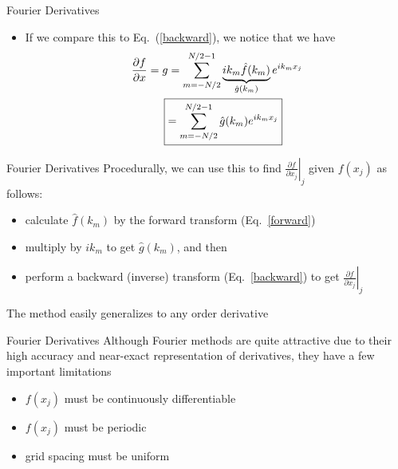 \begin{frame}{Fourier Derivatives}
\begin{itemize}
	\item If we compare this to Eq.~(\ref{backward}), we notice that we have
	\begin{align*}
		\frac{\partial f}{\partial x} = g &= \sum^{N/2 -1}_{m = -N/2}\underbrace{i k_m \hat f(k_m)}_{\hat g(k_m)} e^{i k_m x_j}\\
		\Aboxed{&=\sum^{N/2 -1}_{m = -N/2} \hat g (k_m) e^{i k_m x_j}}
	\end{align*}
\end{itemize}
\end{frame}

\begin{frame}{Fourier Derivatives}
Procedurally, we can use this to find $\left.\frac{\partial f}{\partial x_j}\right|_j$ given $f(x_j)$ as follows:
\begin{itemize}
	\item calculate $\hat f(k_m)$ by the forward transform (Eq.~\ref{forward})
	\item multiply by $i k_m$ to get $\hat g (k_m)$, and then
	\item perform a backward (inverse) transform (Eq.~\ref{backward}) to get $\left.\frac{\partial f}{\partial x_j}\right|_j$
\end{itemize}
The method easily generalizes to any order derivative

\end{frame}

\begin{frame}{Fourier Derivatives}
Although Fourier methods are quite attractive due to their high accuracy and near-exact representation of derivatives, they have a few important limitations
\begin{itemize}
	\item $f(x_j)$ must be continuously differentiable
	\item $f(x_j)$ must be periodic
	\item grid spacing must be uniform
\end{itemize}

\end{frame}

